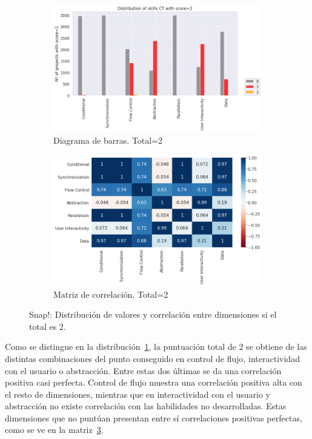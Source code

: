 \documentclass[a4paper, 12pt]{book}
\begin{document}
\begin{figure}[H]
    \centering
    \begin{subfigure}[h]{.49\textwidth} 
        \includegraphics[width=\textwidth]{img/distribucion_2_Snap}
        \caption{Diagrama de barras. Total=2}
        \label{fig:total2_Snap}
    \end{subfigure}       
    \begin{subfigure}[h]{.49\textwidth} 
        \includegraphics[width=\textwidth]{img/corr_2_Snap}
        \caption{Matriz de correlación. Total=2}
        \label{fig:corr2_Snap}
    \end{subfigure}
     \caption{Snap!: Distribución de valores y correlación entre dimensiones si el total es 2.}
\end{figure}

Como se distingue en la distribución~\ref{fig:total2_Snap}, la puntuación total de 2 se obtiene de las distintas combinaciones del punto conseguido en control de flujo, interactividad con el usuario o abstracción. Entre estas dos últimas se da una correlación positiva casi perfecta. Control de flujo muestra una correlación positiva alta con el resto de dimensiones, mientras que en interactividad con el usuario y abstracción no existe correlación con las habilidades no desarrolladas. Estas dimensiones que no puntúan presentan entre sí correlaciones positivas perfectas, como se ve en la matriz~\ref{fig:corr2_Snap}.
\end{document}
